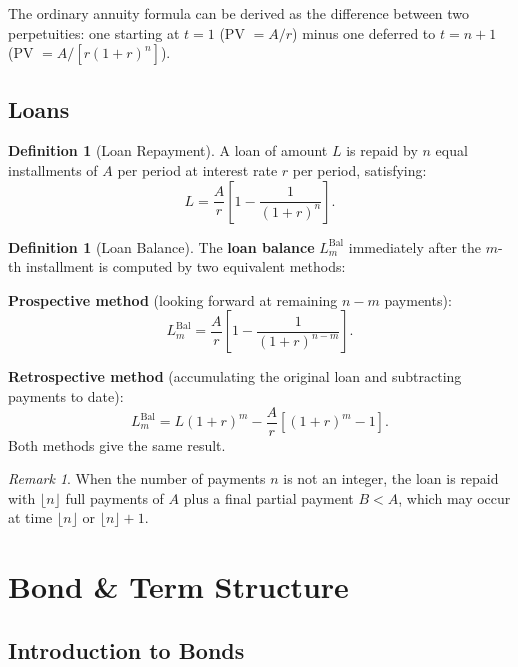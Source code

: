 \documentclass[12pt, a4paper]{article}
\theoremstyle{plain}
\theoremstyle{definition}
\newtheorem{definition}[theorem]{Definition}
\theoremstyle{remark}
\newtheorem{remark}[theorem]{Remark}
\newenvironment{sidenote}{%
  \par\vspace{0.5em}%
  \noindent\color{defcolor}%
}{%
  \par\vspace{0.5em}%
  \color{black}%
}
\begin{document}
\begin{sidenote}
  The ordinary annuity formula can be derived as the difference between two perpetuities: one starting at $t=1$ (PV $= A/r$) minus one deferred to $t=n+1$ (PV $= A/[r(1+r)^n]$).
\end{sidenote}

\subsection{Loans}

\begin{definition}[Loan Repayment]
  A loan of amount $L$ is repaid by $n$ equal installments of $A$ per period at interest rate $r$ per period, satisfying:
  \[
    L = \frac{A}{r}\left[1 - \frac{1}{(1+r)^n}\right].
  \]
\end{definition}

\begin{definition}[Loan Balance]
  The \textbf{loan balance} $L^{\text{Bal}}_m$ immediately after the $m$-th installment is computed by two equivalent methods:

  \textbf{Prospective method} (looking forward at remaining $n-m$ payments):
  \[
    L^{\text{Bal}}_m = \frac{A}{r}\left[1 - \frac{1}{(1+r)^{n-m}}\right].
  \]

  \textbf{Retrospective method} (accumulating the original loan and subtracting payments to date):
  \[
    L^{\text{Bal}}_m = L(1+r)^m - \frac{A}{r}\left[(1+r)^m - 1\right].
  \]
  Both methods give the same result.
\end{definition}

\begin{remark}
  When the number of payments $n$ is not an integer, the loan is repaid with $\lfloor n \rfloor$ full payments of $A$ plus a final partial payment $B < A$, which may occur at time $\lfloor n \rfloor$ or $\lfloor n \rfloor + 1$.
\end{remark}
\pagebreak
\section{Bond \& Term Structure}

\subsection{Introduction to Bonds}
\end{document}
